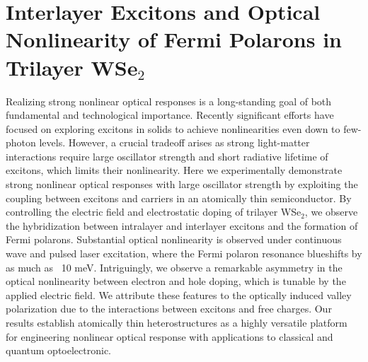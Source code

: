 
\renewcommand{\thechapter}{5}

\chapter{Interlayer Excitons and Optical Nonlinearity of Fermi Polarons in Trilayer WSe$_2$}
\label{chap5}

Realizing strong nonlinear optical responses is a long-standing goal of both fundamental and technological importance. Recently significant efforts have focused on exploring excitons in solids to achieve nonlinearities even down to few-photon levels. 
However, a crucial tradeoff arises as strong light-matter interactions require large oscillator strength and short radiative lifetime of excitons, which limits their nonlinearity. 
Here we experimentally demonstrate strong nonlinear optical responses with large oscillator strength by exploiting the coupling between excitons and carriers in an atomically thin semiconductor. 
By controlling the electric field and electrostatic doping of trilayer WSe$_2$, we observe the hybridization between intralayer and interlayer excitons and the formation of Fermi polarons. 
Substantial optical nonlinearity is observed under continuous wave and pulsed laser excitation, where the Fermi polaron resonance blueshifts by as much as ~10 meV. 
Intriguingly, we observe a remarkable asymmetry in the optical nonlinearity between electron and hole doping, which is tunable by the applied electric field.
We attribute these features to the optically induced valley polarization due to the interactions between excitons and free charges. 
Our results establish atomically thin heterostructures as a highly versatile platform for engineering nonlinear optical response with applications to classical and quantum optoelectronic.

